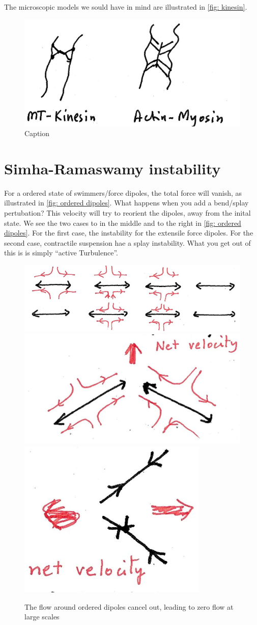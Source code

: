 The microscopic models we sould have in mind are illustrated in \autoref{fig: kinesin}.

\begin{figure}[!htb]
    \centering
    \includegraphics[width=.25\textwidth]{chapters/Figures/nematics/kinesin.png}
    \caption{Caption}
    \label{fig: kinesin}
\end{figure}

\section{Simha-Ramaswamy instability}

For a ordered state of swimmers/force dipoles, the total force will vanish, as illustrated in \autoref{fig: ordered dipoles}.
What happens when you add a bend/splay pertubation?
This velocity will try to reorient the dipoles, away from the inital state.
We see the two cases to in the middle and to the right in \autoref{fig: ordered dipoles}.
For the first case, the instability for the extensile force dipoles.
For the second case,
 contractile suspension hae a splay instability.
 What you get out of this is is simply ``active Turbulence''. 

\begin{figure}[!htb]
    \centering
    \includegraphics[width=.35\textwidth]{chapters/Figures/nematics/dipoles.png}
    \includegraphics[width=.25\textwidth]{chapters/Figures/nematics/perturb1.png}
    \includegraphics[width=.13\textwidth]{chapters/Figures/nematics/perturb2.png}
    \caption{The flow around ordered dipoles cancel out, leading to zero flow at large scales}
    \label{fig: ordered dipoles}
\end{figure}

